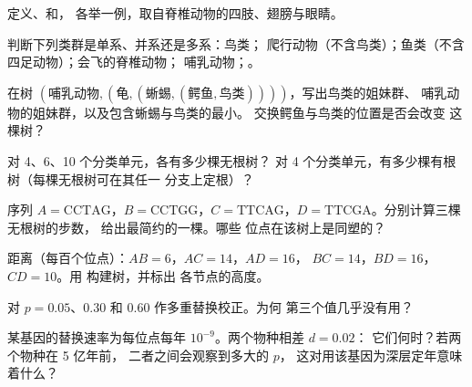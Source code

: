 \begin{exercise}[$\star$]\label{exo:b2:phylogenetic-trees:1}
定义、和，
各举一例，取自脊椎动物的四肢、翅膀与眼睛。
\end{exercise}

\begin{exercise}[$\star$]\label{exo:b2:phylogenetic-trees:2}
判断下列类群是单系、并系还是多系：鸟类；
爬行动物（不含鸟类）；鱼类（不含四足动物）；会飞的脊椎动物；
哺乳动物；。
\end{exercise}

\begin{exercise}[$\star$]\label{exo:b2:phylogenetic-trees:3}
在树 $(\text{哺乳动物},(\text{龟},(\text{蜥蜴},
(\text{鳄鱼},\text{鸟类}))))$，写出鸟类的姐妹群、
哺乳动物的姐妹群，以及包含蜥蜴与鸟类的最小。
交换鳄鱼与鸟类的位置是否会改变
这棵树？
\end{exercise}

\begin{exercise}[$\star$]\label{exo:b2:phylogenetic-trees:4}
对 4、6、10 个分类单元，各有多少棵无根树？
对 4 个分类单元，有多少棵有根树（每棵无根树可在其任一
分支上定根）？
\end{exercise}

\begin{exercise}[$\star\star$]\label{exo:b2:phylogenetic-trees:5}
序列 $A = \mathrm{CCTAG}$，$B = \mathrm{CCTGG}$，$C =
\mathrm{TTCAG}$，$D = \mathrm{TTCGA}$。分别计算三棵无根树的步数，
给出最简约的一棵。哪些
位点在该树上是同塑的？
\end{exercise}

\begin{exercise}[$\star\star$]\label{exo:b2:phylogenetic-trees:6}
距离（每百个位点）：$AB = 6$，$AC = 14$，$AD = 16$，
$BC = 14$，$BD = 16$，$CD = 10$。用  构建树，并标出
各节点的高度。
\end{exercise}

\begin{exercise}[$\star\star$]\label{exo:b2:phylogenetic-trees:7}
对 $p = 0.05$、$0.30$ 和 $0.60$ 作多重替换校正。为何
第三个值几乎没有用？
\end{exercise}

\begin{exercise}[$\star\star$]\label{exo:b2:phylogenetic-trees:8}
某基因的替换速率为每位点每年 $10^{-9}$。两个物种相差 $d = 0.02$：
它们何时？若两个物种在 5 亿年前，
二者之间会观察到多大的 $p$，
这对用该基因为深层定年意味着什么？
\end{exercise}

